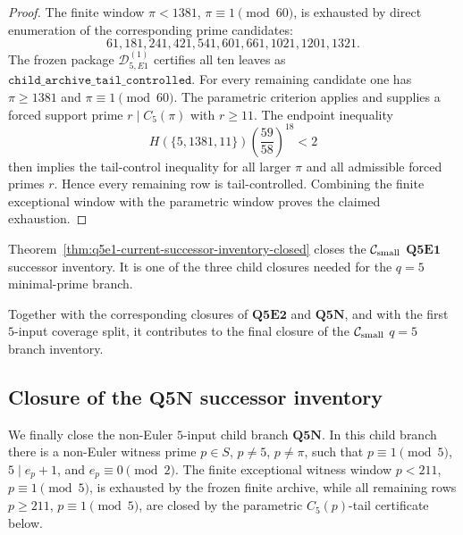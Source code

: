 \begin{proof}
The finite window \(\pi<1381\), \(\pi\equiv1\pmod{60}\), is exhausted by direct
enumeration of the corresponding prime candidates:
\[
  61,181,241,421,541,601,661,1021,1201,1321.
\]
The frozen package \(\mathcal D_{5,E1}^{(1)}\) certifies all ten leaves as
\(\mathtt{child\_archive\_tail\_controlled}\).  For every remaining candidate
one has \(\pi\ge1381\) and \(\pi\equiv1\pmod{60}\).  The parametric criterion
applies and supplies a forced support prime \(r\mid C_5(\pi)\) with \(r\ge11\).
The endpoint inequality
\[
  H(\{5,1381,11\})
  \left(\frac{59}{58}\right)^{18}<2
\]
then implies the tail-control inequality for all larger \(\pi\) and all
admissible forced primes \(r\).  Hence every remaining row is tail-controlled.
Combining the finite exceptional window with the parametric window proves the
claimed exhaustion.
\end{proof}

\begin{remark}
\label{rem:scope-q5e1-current-successor-inventory-closed}
Theorem~\ref{thm:q5e1-current-successor-inventory-closed} closes the
\(\mathcal C_{\mathrm{small}}\) \(\mathbf{Q5E1}\) successor inventory.  It is one of the three child
closures needed for the \(q=5\) minimal-prime branch.

Together with the corresponding closures of \(\mathbf{Q5E2}\) and
\(\mathbf{Q5N}\), and with the first \(5\)-input coverage split, it contributes
to the final closure of the \(\mathcal C_{\mathrm{small}}\) \(q=5\) branch inventory.
\end{remark}

\subsection{Closure of the \(\mathbf{Q5N}\) successor inventory}

We finally close the non-Euler \(5\)-input child branch
\(\mathbf{Q5N}\).  In this child branch there is a non-Euler witness prime
\(p\in S\), \(p\ne5\), \(p\ne\pi\), such that \(p\equiv1\pmod5\),
\(5\mid e_p+1\), and \(e_p\equiv0\pmod2\).  The finite exceptional witness
window \(p<211\), \(p\equiv1\pmod5\), is exhausted by the frozen finite archive,
while all remaining rows \(p\ge211\), \(p\equiv1\pmod5\), are closed by the
parametric \(C_5(p)\)-tail certificate below.


